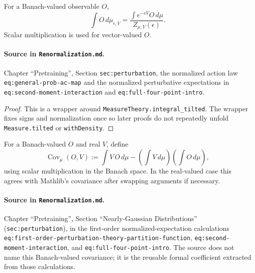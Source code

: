 \begin{lemma}
\label{lem:renorm:deformIntegral}
For a Banach-valued observable $O$,
\[
 \int O\,d\mu_{\epsilon,V}
 =\frac{\int e^{-\epsilon V}O\,d\mu}{Z_{\mu,V}(\epsilon)}.
\]
Scalar multiplication is used for vector-valued $O$.

\paragraph{Source in \texttt{Renormalization.md}.}
Chapter ``Pretraining'', Section \texttt{sec:perturbation}, the normalized action law
\texttt{eq:general-prob-ac-map} and the normalized perturbative expectations in
\texttt{eq:second-moment-interaction} and \texttt{eq:full-four-point-intro}.
\end{lemma}

\begin{proof}
This is a wrapper around \texttt{MeasureTheory.integral\_tilted}.  The wrapper fixes signs and
normalization once so later proofs do not repeatedly unfold \texttt{Measure.tilted} or
\texttt{withDensity}.
\end{proof}

\begin{definition}
\label{def:renorm:covarianceWith}
For a Banach-valued $O$ and real $V$, define
\[
 \operatorname{Cov}_\mu(O,V)
 :=\int V\,O\,d\mu-\left(\int V\,d\mu\right)\left(\int O\,d\mu\right),
\]
using scalar multiplication in the Banach space.  In the real-valued case this agrees with
Mathlib's covariance after swapping arguments if necessary.

\paragraph{Source in \texttt{Renormalization.md}.}
Chapter ``Pretraining'', Section ``Nearly-Gaussian Distributions'' (\texttt{sec:perturbation}), in
the first-order normalized-expectation calculations
\texttt{eq:first-order-perturbation-theory-partition-function},
\texttt{eq:second-moment-interaction}, and \texttt{eq:full-four-point-intro}.  The source does not
name this Banach-valued covariance; it is the reusable formal coefficient extracted from those
calculations.
\end{definition}

